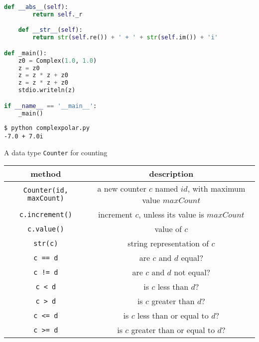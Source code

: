 \documentclass[8pt,a4paper,compress]{beamer}
\begin{document}
\begin{frame}[fragile]
\pause

\begin{lstlisting}[language=Python]
    def __abs__(self):
        return self._r

    def __str__(self):
        return str(self.re()) + ' + ' + str(self.im()) + 'i'

def _main():
    z0 = Complex(1.0, 1.0)
    z = z0
    z = z * z + z0
    z = z * z + z0
    stdio.writeln(z)

if __name__ == '__main__':
    _main()
\end{lstlisting}

\pause

\begin{lstlisting}[language={}]
$ python complexpolar.py 
-7.0 + 7.0i
\end{lstlisting}
\end{frame}

\begin{frame}[fragile]
\pause

A data type \lstinline{Counter} for counting
\begin{center}
\begin{tabular}{cc}
method & description \\ \hline
\lstinline$Counter(id, maxCount)$ & a new counter $c$ named $id$, with maximum value $maxCount$ \\
\lstinline$c.increment()$ & increment $c$, unless its value is $maxCount$ \\
\lstinline$c.value()$ & value of $c$ \\
\lstinline$str(c)$ & string representation of $c$ \\
\lstinline$c == d$ & are $c$ and $d$ equal? \\
\lstinline$c != d$ & are $c$ and $d$ not equal? \\
\lstinline$c < d$ & is $c$ less than $d$? \\
\lstinline$c > d$ & is $c$ greater than $d$? \\
\lstinline$c <= d$ & is $c$ less than or equal to $d$? \\
\lstinline$c >= d$ & is $c$ greater than or equal to $d$? \\
\end{tabular} 
\end{center}
\end{frame}
\end{document}
